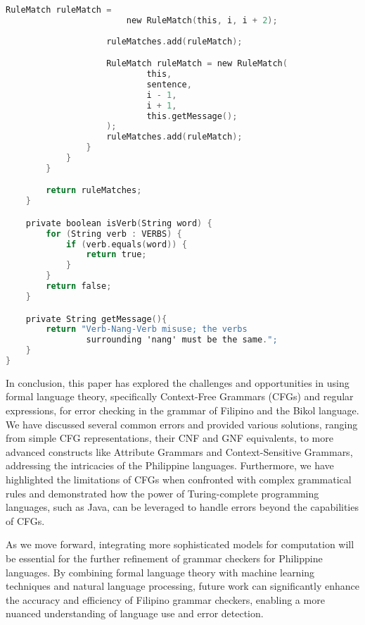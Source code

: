 \begin{lstlisting}[language=C, caption=Implementation of Verb-Nang-Verb Grammar Rule in Java]
                    RuleMatch ruleMatch = 
                        new RuleMatch(this, i, i + 2);
                    
                    ruleMatches.add(ruleMatch);

                    RuleMatch ruleMatch = new RuleMatch(
                            this,
                            sentence,
                            i - 1,
                            i + 1,
                            this.getMessage();
                    );
                    ruleMatches.add(ruleMatch);
                }
            }
        }

        return ruleMatches;
    }

    private boolean isVerb(String word) {
        for (String verb : VERBS) {
            if (verb.equals(word)) {
                return true;
            }
        }
        return false;
    }

    private String getMessage(){
        return "Verb-Nang-Verb misuse; the verbs 
                surrounding 'nang' must be the same.";
    }
}
\end{lstlisting}

In conclusion, this paper has explored the challenges and opportunities in using formal language theory, specifically Context-Free Grammars (CFGs) and regular expressions, for error checking in the grammar of Filipino and the Bikol language. We have discussed several common errors and provided various solutions, ranging from simple CFG representations, their CNF and GNF equivalents, to more advanced constructs like Attribute Grammars and Context-Sensitive Grammars, addressing the intricacies of the Philippine languages. Furthermore, we have highlighted the limitations of CFGs when confronted with complex grammatical rules and demonstrated how the power of Turing-complete programming languages, such as Java, can be leveraged to handle errors beyond the capabilities of CFGs.

As we move forward, integrating more sophisticated models for computation will be essential for the further refinement of grammar checkers for Philippine languages. By combining formal language theory with machine learning techniques and natural language processing, future work can significantly enhance the accuracy and efficiency of Filipino grammar checkers, enabling a more nuanced understanding of language use and error detection.